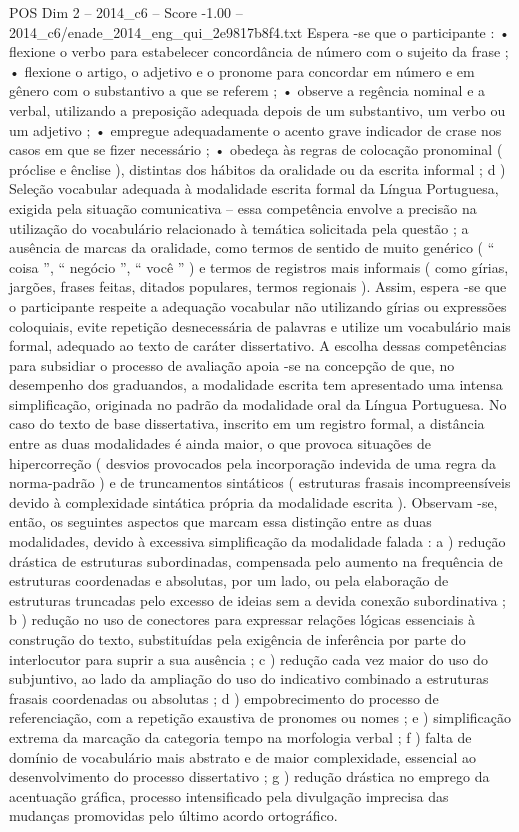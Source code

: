 \begin{textsample}{POS Dim 2 – 2014\_c6 – Score -1.00 – 2014\_c6/enade\_2014\_eng\_qui\_2e9817b8f4.txt}
Espera -se que o participante : • flexione o verbo para estabelecer concordância de número com o sujeito da frase ; • flexione o artigo, o adjetivo e o pronome para concordar em número e em gênero com o substantivo a que se referem ; • observe a regência nominal e a verbal, utilizando a preposição adequada depois de um substantivo, um verbo ou um adjetivo ; • empregue adequadamente o acento grave indicador de crase nos casos em que se fizer necessário ; • obedeça às regras de colocação pronominal ( próclise e ênclise ), distintas dos hábitos da oralidade ou da escrita informal ; d ) Seleção vocabular adequada à modalidade escrita formal da Língua Portuguesa, exigida pela situação comunicativa – essa competência envolve a precisão na utilização do vocabulário relacionado à temática solicitada pela questão ; a ausência de marcas da oralidade, como termos de sentido de muito genérico ( “ coisa ”, “ negócio ”, “ você ” ) e termos de registros mais informais ( como gírias, jargões, frases feitas, ditados populares, termos regionais ).
Assim, espera -se que o participante respeite a adequação vocabular não utilizando gírias ou expressões coloquiais, evite repetição desnecessária de palavras e utilize um vocabulário mais formal, adequado ao texto de caráter dissertativo.
A escolha dessas competências para subsidiar o processo de avaliação apoia -se na concepção de que, no desempenho dos graduandos, a modalidade escrita tem apresentado uma intensa simplificação, originada no padrão da modalidade oral da Língua Portuguesa.
No caso do texto de base dissertativa, inscrito em um registro formal, a distância entre as duas modalidades é ainda maior, o que provoca situações de hipercorreção ( desvios provocados pela incorporação indevida de uma regra da norma-padrão ) e de truncamentos sintáticos ( estruturas frasais incompreensíveis devido à complexidade sintática própria da modalidade escrita ).
Observam -se, então, os seguintes aspectos que marcam essa distinção entre as duas modalidades, devido à excessiva simplificação da modalidade falada : a ) redução drástica de estruturas subordinadas, compensada pelo aumento na frequência de estruturas coordenadas e absolutas, por um lado, ou pela elaboração de estruturas truncadas pelo excesso de ideias sem a devida conexão subordinativa ; b ) redução no uso de conectores para expressar relações lógicas essenciais à construção do texto, substituídas pela exigência de inferência por parte do interlocutor para suprir a sua ausência ; c ) redução cada vez maior do uso do subjuntivo, ao lado da ampliação do uso do indicativo combinado a estruturas frasais coordenadas ou absolutas ; d ) empobrecimento do processo de referenciação, com a repetição exaustiva de pronomes ou nomes ; e ) simplificação extrema da marcação da categoria tempo na morfologia verbal ; f ) falta de domínio de vocabulário mais abstrato e de maior complexidade, essencial ao desenvolvimento do processo dissertativo ; g ) redução drástica no emprego da acentuação gráfica, processo intensificado pela divulgação imprecisa das mudanças promovidas pelo último acordo ortográfico.

\end{textsample}
